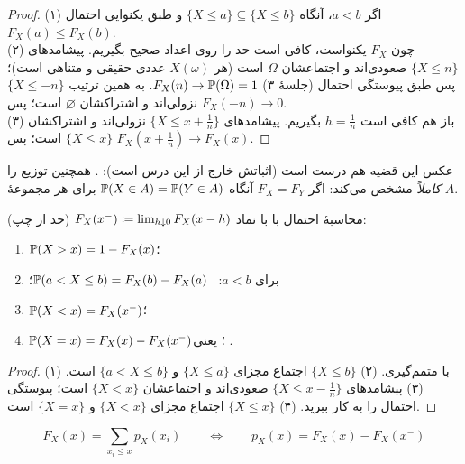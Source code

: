 \begin{proof}
(۱) اگر $a<b$، آنگاه $\{X\le a\}\subseteq\{X\le b\}$ و طبق یکنوایی احتمال $F_X(a)\le F_X(b)$.\\
(۲) چون $F_X$ یکنواست، کافی است حد را روی اعداد صحیح بگیریم. پیشامدهای $\{X\le n\}$ صعودی‌اند و اجتماعشان $\Omega$ است (هر $X(\omega)$ عددی حقیقی و متناهی است)؛ پس طبق پیوستگی احتمال (جلسهٔ ۳) $F_X(n)\to\P(\Omega)=1$. به همین ترتیب $\{X\le-n\}$ نزولی‌اند و اشتراکشان $\varnothing$ است؛ پس $F_X(-n)\to0$.\\
(۳) باز هم کافی است $h=\frac1n$ بگیریم. پیشامدهای $\{X\le x+\frac1n\}$ نزولی‌اند و اشتراکشان $\{X\le x\}$ است؛ پس $F_X(x+\frac1n)\to F_X(x)$.
\end{proof}

\begin{note}
عکس این قضیه هم درست است (اثباتش خارج از این درس است): . همچنین  توزیع را \emph{کاملاً} مشخص می‌کند: اگر $F_X=F_Y$ آنگاه $\P(X\in A)=\P(Y\in A)$ برای هر مجموعهٔ $A$.
\end{note}

\begin{proposition}[label=prop:cdf-probs]{محاسبهٔ احتمال با }
با نماد $F_X(x^-)\defeq\lim_{h\downarrow0}F_X(x-h)$ (حد از چپ):
\begin{enumerate}
  \item $\P(X>x)=1-F_X(x)$؛
  \item برای $a<b$: \ $\P(a<X\le b)=F_X(b)-F_X(a)$؛
  \item $\P(X<x)=F_X(x^-)$؛
  \item $\P(X=x)=F_X(x)-F_X(x^-)$؛ یعنی .
\end{enumerate}
\end{proposition}

\begin{proof}
(۱) با متمم‌گیری. (۲) $\{X\le b\}$ اجتماع مجزای $\{X\le a\}$ و $\{a<X\le b\}$ است. (۳) پیشامدهای $\{X\le x-\frac1n\}$ صعودی‌اند و اجتماعشان $\{X<x\}$ است؛ پیوستگی احتمال را به کار ببرید. (۴) $\{X\le x\}$ اجتماع مجزای $\{X<x\}$ و $\{X=x\}$ است.
\end{proof}

\begin{keyformula}
\[ F_X(x)=\sum_{x_i\le x}p_X(x_i)\qquad\Longleftrightarrow\qquad p_X(x)=F_X(x)-F_X(x^-) \]
\end{keyformula}

